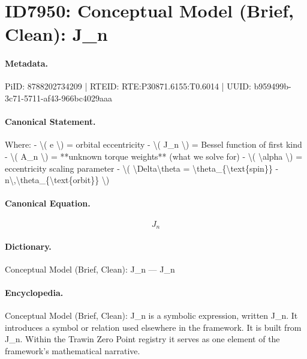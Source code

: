 \section*{ID7950: Conceptual Model (Brief, Clean): J\_n}
\paragraph{Metadata.}
PiID: 8788202734209 | RTEID: RTE:P30871.6155:T0.6014 | UUID: b959499b-3c71-5711-af43-966bc4029aaa

\paragraph{Canonical Statement.}
Where: - \textbackslash{}( e \textbackslash{}) = orbital eccentricity - \textbackslash{}( J\_n \textbackslash{}) = Bessel function of first kind - \textbackslash{}( A\_n \textbackslash{}) = **unknown torque weights** (what we solve for) - \textbackslash{}( \textbackslash{}alpha \textbackslash{}) = eccentricity scaling parameter - \textbackslash{}( \textbackslash{}Delta\textbackslash{}theta = \textbackslash{}theta\_\{\textbackslash{}text\{spin\}\} - n\textbackslash{},\textbackslash{}theta\_\{\textbackslash{}text\{orbit\}\} \textbackslash{})

\paragraph{Canonical Equation.}
\[
J_n
\]

\paragraph{Dictionary.}
Conceptual Model (Brief, Clean): J\_n — J\_n

\paragraph{Encyclopedia.}
Conceptual Model (Brief, Clean): J\_n is a symbolic expression, written J\_n. It introduces a symbol or relation used elsewhere in the framework. It is built from J\_n. Within the Trawin Zero Point registry it serves as one element of the framework's mathematical narrative.

